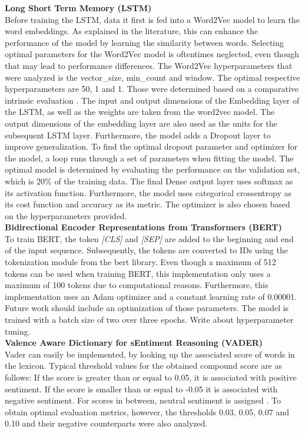 \documentclass[11pt, a4paper]{article}
\begin{document}
\noindent\textbf{Long Short Term Memory (LSTM)}\\
Before training the LSTM, data it first is fed into a Word2Vec model to learn the word embeddings. As explained in the literature, this can enhance the performance of the model by learning the similarity between words.
Selecting optimal parameters for the Word2Vec model is oftentimes neglected, even though that may lead to performance differences.
The Word2Vec hyperparameters that were analyzed is the vector\_size, min\_count and window. The optimal respective hyperparameters are 50, 1 and 1. Those were determined based on a comparative intrinsic evaluation \citep{schnabel2015embeddings}.
The input and output dimensions of the Embedding layer of the LSTM, as well as the weights are taken from the word2vec model.
The output dimensions of the embedding layer are also used as the units for the subsequent LSTM layer. Furthermore, the model adds a Dropout layer to improve generalization. To find the optimal dropout parameter and optimizer for the model,
a loop runs through a set of parameters when fitting the model. The optimal model is determined by evaluating the performance on the validation set, which is 20\% of the training data. 
The final Dense output layer uses softmax as its activation function. Furthermore, the model uses categorical crossentropy as its cost function and accuracy as its metric. The optimizer is also chosen based on the hyperparameters provided.\\

\noindent\textbf{Bidirectional Encoder Representations from Transformers (BERT)}\\
To train BERT, the token \emph{[CLS]} and \emph{[SEP]} are added to the beginning and end of the input sequence. Subsequently, the tokens are converted to IDs using the tokenization
module from the bert library. Even though a maximum of 512 tokens can be used when training BERT, this implementation only uses a maximum of 100 tokens due to computational reasons.
Furthermore, this implementation uses an Adam optimizer and a constant learning rate of 0.00001. Future work should include an optimization of those parameters. The model is trained with
a batch size of two over three epochs. Write about hyperparameter tuning.\\

\noindent\textbf{Valence Aware Dictionary for sEntiment Reasoning (VADER)}\\
Vader can easily be implemented, by looking up the associated score of words in the lexicon. Typical threshold values for the obtained compound score are as follows: 
If the score is greater than or equal to 0.05, it is associated with positive sentiment. If the score is smaller than or equal to -0.05 it is associated with negative sentiment. For scores
in between, neutral sentiment is assigned \citep{hutto2015vader}. To obtain optimal evaluation metrics, however, the thresholds 0.03, 0.05, 0.07 and 0.10 and their negative counterparts were
also analyzed.
\end{document}
